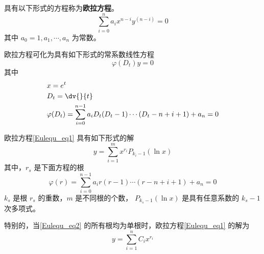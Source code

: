 

具有以下形式的方程称为\textbf{欧拉方程}。
\begin{equation}\label{Eulequ_eq1}
\sum_{i=0}^{n}a_ix^{n-i}y^{(n-i)}=0
\end{equation}
其中 $a_0=1,a_1,\cdots,a_n$ 为常数。

欧拉方程可化为具有如下形式的常系数线性方程
\begin{equation}\label{Eulequ_eq4}
\varphi(D_t)y=0
\end{equation}
其中
\begin{equation}
\begin{aligned}
&x=e^t\\
&D_t=\dv{}{t}\\
&\varphi(D_t)=\sum_{i=0}^{n-1}a_iD_t(D_t-1)\cdots(D_t-n+i+1)+a_n=0
\end{aligned}
\end{equation}

欧拉方程\autoref{Eulequ_eq1} 具有如下形式的解
\begin{equation}\label{Eulequ_eq6}
y=\sum_{i=1}^mx^{r_i}P_{k_i-1}(\ln x)
\end{equation}
其中，$r_s$ 是下面方程的根
\begin{equation}\label{Eulequ_eq2}
\varphi(r)=\sum_{i=0}^{n-1}a_ir(r-1)\cdots(r-n+i+1)+a_n=0
\end{equation}
$k_s$ 是根 $r_s$ 的重数，$m$ 是不同根的个数， $P_{k_s-1}(\ln x)$ 是具有任意系数的 $k_s-1$ 次多项式。 

特别的，当\autoref{Eulequ_eq2} 的所有根均为单根时，欧拉方程\autoref{Eulequ_eq1} 的解为
\begin{equation}
y=\sum_{i=1}^{n}C_ix^{r_i}
\end{equation}


